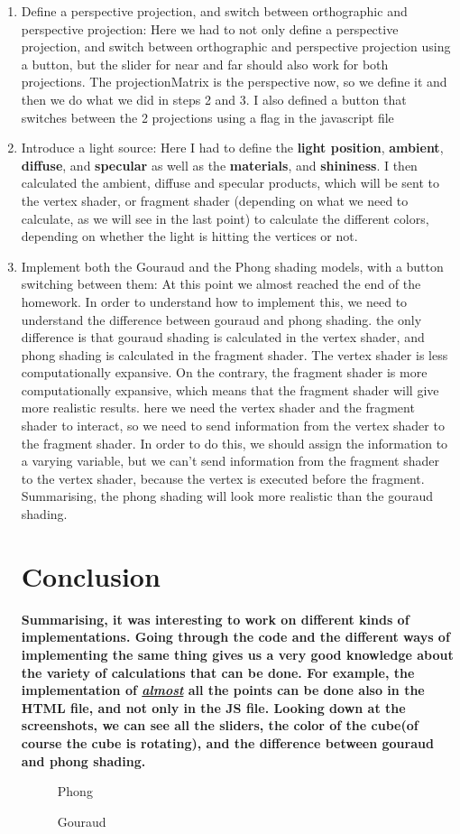\documentclass[10pt]{article}
\begin{document}
\begin{enumerate}
\item Define a perspective projection, and switch between orthographic and perspective projection:
Here we had to not only define a perspective projection, and switch between orthographic and perspective projection using a button, but the slider for near and far should also work for both projections.
The projectionMatrix is the perspective now, so we define it and then we do what we did in steps 2 and 3. I also defined a button that switches between the 2 projections using a flag in the javascript file 
\item Introduce a light source:
Here I had to define the \textbf{light position}, \textbf{ambient}, \textbf{diffuse}, and \textbf{specular} as well as the \textbf{materials}, and \textbf{shininess}. I then calculated the ambient, diffuse and specular products, which will be sent to the vertex shader, or fragment shader (depending on what we need to calculate, as we will see in the last point) to calculate the different colors, depending on whether the light is hitting the vertices or not.
\item Implement both the Gouraud and the Phong shading models, with a button switching between
them:
At this point we almost reached the end of the homework. In order to understand how to implement this, we need to understand the difference between gouraud and phong shading. the only difference is that gouraud shading is calculated in the vertex shader, and phong shading is calculated in the fragment shader. The vertex shader is less computationally expansive. On the contrary, the fragment shader is more computationally expansive, which means that the fragment shader will give more realistic results. here we need the vertex shader and the fragment shader to interact, so we need to send information from the vertex shader to the fragment shader. In order to do this, we should assign the information to a varying variable, but we can't send information from the fragment shader to the vertex shader, because the vertex is executed before the fragment. Summarising, the phong shading will look more realistic than the gouraud shading.
\section {Conclusion}
\textbf{Summarising, it was interesting to work on different kinds of implementations. Going through the code and the different ways of implementing the same thing gives us a very good knowledge about the variety of calculations that can be done. For example, the implementation of \textit{\underline{almost}} all the points can be done also in the HTML file, and not only in the JS file. Looking down at the screenshots, we can see all the sliders, the color of the cube(of course the cube is rotating), and the difference between gouraud and phong shading.}
\begin{figure}[!ht]
\centering
\caption{Phong}
\label{fig:fig1}
\end{figure}
\begin{figure}[!ht]
\centering
\caption{Gouraud}
\label{fig:fig1}
\end{figure}
\end{enumerate}
\end{document}
